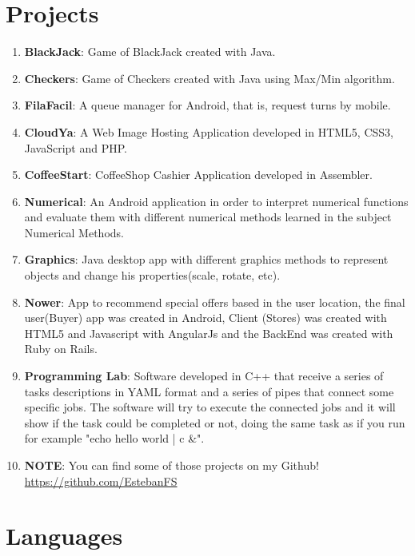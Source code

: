 \documentclass[a4paper,10pt]{article} %
\begin{document}
\section{Projects}
\begin{enumerate}
\item \textbf{BlackJack}: Game of BlackJack created with Java.
\item \textbf{Checkers}:  Game of Checkers created with Java using Max/Min algorithm.
\item \textbf{FilaFacil}: A queue manager for Android, that is, request turns by mobile.
\item \textbf{CloudYa}: A Web Image Hosting Application developed in HTML5, CSS3, JavaScript and PHP.
\item \textbf{CoffeeStart}: CoffeeShop Cashier Application developed in Assembler.
\item \textbf{Numerical}: An Android application in order to interpret numerical functions and evaluate them with different numerical methods learned in the subject Numerical Methods.
\item \textbf{Graphics}: Java desktop app with different graphics methods to represent objects and change his properties(scale, rotate, etc).
\item \textbf{Nower}: App to recommend special offers based in the user location, the final user(Buyer) app was created in Android, Client (Stores) was created with HTML5 and Javascript with AngularJs and the BackEnd was created with Ruby on Rails.
\item \textbf{Programming Lab}: Software developed in C++ that receive a series of tasks descriptions in YAML format and a series of pipes that connect some specific jobs. The software will try to execute the connected jobs and it will show if the task could be completed or not, doing the same task as if you run for example "echo hello world | c \&".
\item \textbf{NOTE}: You can find some of those projects on my Github! \href{https://github.com/EstebanFS}{https://github.com/EstebanFS}
\end{enumerate}



\section{Languages}
\end{document}
